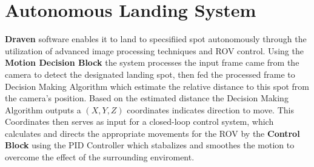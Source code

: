 \documentclass{article}
\begin{document}
\section{Autonomous Landing System}
\textbf{Draven} software enables it to land to specsifiied spot autonomously through the utilization of advanced image processing techniques and ROV control. 
Using the \textbf{Motion Decision Block} the system processes the input frame came from the camera to detect the designated landing spot, then fed the processed frame to Decision Making Algorithm which estimate the relative distance to this spot from the camera's position.
Based on the estimated distance the Decision Making Algorithm outputs a $(X,Y,Z)$ coordinates indicates direction to move.
This Coordinates then serves as input for a closed-loop control system, which calculates and directs the appropriate movements for the ROV by the \textbf{Control Block} using the {PID Controller} which stabalizes and smoothes the motion to overcome the effect of the surrounding enviroment.
\end{document}
